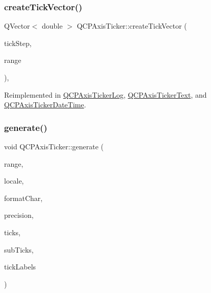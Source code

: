 \mbox{\label{class_q_c_p_axis_ticker_af4645a824c7bd2ca8fc7e86ebf9055bd}} 
\subsubsection{\texorpdfstring{createTickVector()}{createTickVector()}}
{\footnotesize\ttfamily Q\+Vector$<$ double $>$ Q\+C\+P\+Axis\+Ticker\+::create\+Tick\+Vector (\begin{DoxyParamCaption}\item[{double}]{tick\+Step,  }\item[{const \mbox{\hyperlink{class_q_c_p_range}{Q\+C\+P\+Range}} \&}]{range }\end{DoxyParamCaption})\hspace{0.3cm}{\ttfamily [protected]}, {\ttfamily [virtual]}}



Reimplemented in \mbox{\hyperlink{class_q_c_p_axis_ticker_log_af8873a8d1d2b9392d8f7a73218c889ab}{Q\+C\+P\+Axis\+Ticker\+Log}}, \mbox{\hyperlink{class_q_c_p_axis_ticker_text_aa195c4fd0364d0393f1798fb495d6a60}{Q\+C\+P\+Axis\+Ticker\+Text}}, and \mbox{\hyperlink{class_q_c_p_axis_ticker_date_time_a44c2c09a303d281801b69226e243047d}{Q\+C\+P\+Axis\+Ticker\+Date\+Time}}.

\mbox{\label{class_q_c_p_axis_ticker_aefbd11725678ca824add8cf926cbc856}} 
\subsubsection{\texorpdfstring{generate()}{generate()}}
{\footnotesize\ttfamily void Q\+C\+P\+Axis\+Ticker\+::generate (\begin{DoxyParamCaption}\item[{const \mbox{\hyperlink{class_q_c_p_range}{Q\+C\+P\+Range}} \&}]{range,  }\item[{const Q\+Locale \&}]{locale,  }\item[{Q\+Char}]{format\+Char,  }\item[{int}]{precision,  }\item[{Q\+Vector$<$ double $>$ \&}]{ticks,  }\item[{Q\+Vector$<$ double $>$ $\ast$}]{sub\+Ticks,  }\item[{Q\+Vector$<$ Q\+String $>$ $\ast$}]{tick\+Labels }\end{DoxyParamCaption})\hspace{0.3cm}{\ttfamily [virtual]}}

